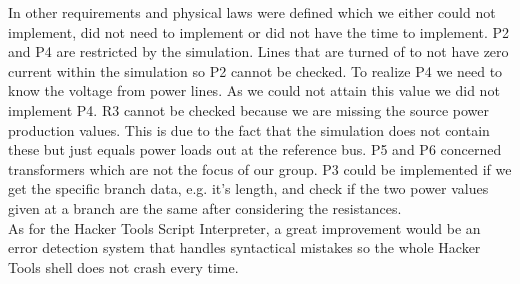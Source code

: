 \documentclass[conference]{IEEEtran}
\begin{document}
		In \cite{chromik1} other requirements and physical laws were defined which we either could not implement, did not need to implement or did not have the time to implement. P2 and P4 are restricted by the simulation. Lines that are turned of to not have zero current within the simulation so P2 cannot be checked. To realize P4 we need to know the voltage from power lines. As we could not attain this value we did not implement P4. R3 cannot be checked because we are missing the source power production values. This is due to the fact that the simulation does not contain these but just equals power loads out at the reference bus. P5 and P6 concerned transformers which are not the focus of our group. P3 could be implemented if we get the specific branch data, e.g. it's length, and check if the two power values given at a branch are the same after considering the resistances. \\
		As for the Hacker Tools Script Interpreter, a great improvement would be an error detection system that handles syntactical mistakes so the whole Hacker Tools shell does not crash every time.




\end{document}
